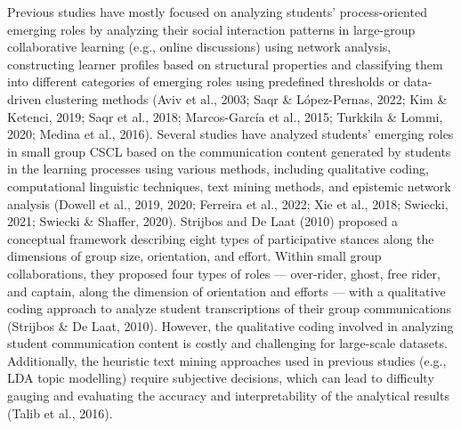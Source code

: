 Previous studies have mostly focused on analyzing students’ process-oriented emerging roles by analyzing their social interaction patterns in large-group collaborative learning (e.g., online discussions) using network analysis, constructing learner profiles based on structural properties and classifying them into different categories of emerging roles using predefined thresholds or data-driven clustering methods (Aviv et al., 2003; Saqr \& López-Pernas, 2022; Kim \& Ketenci, 2019; Saqr et al., 2018; Marcos-García et al., 2015; Turkkila \& Lommi, 2020; Medina et al., 2016). Several studies have analyzed students’ emerging roles in small group CSCL based on the communication content generated by students in the learning processes using various methods, including qualitative coding, computational linguistic techniques, text mining methods, and epistemic network analysis (Dowell et al., 2019, 2020; Ferreira et al., 2022; Xie et al., 2018; Swiecki, 2021; Swiecki \& Shaffer, 2020). Strijbos and De Laat (2010) proposed a conceptual framework describing eight types of participative stances along the dimensions of group size, orientation, and effort. Within small group collaborations, they proposed four types of roles — over-rider, ghost, free rider, and captain, along the dimension of orientation and efforts — with a qualitative coding approach to analyze student transcriptions of their group communications (Strijbos \& De Laat, 2010). However, the qualitative coding involved in analyzing student communication content is costly and challenging for large-scale datasets. Additionally, the heuristic text mining approaches used in previous studies (e.g., LDA topic modelling) require subjective decisions, which can lead to difficulty gauging and evaluating the accuracy and interpretability of the analytical results (Talib et al., 2016).

